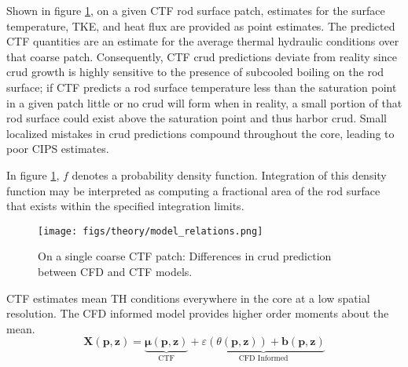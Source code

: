 Shown in figure \ref{fig:model_overview}, on a given CTF rod surface patch, estimates for the surface temperature, TKE, and heat flux are provided as point estimates.  The predicted CTF quantities are an estimate for the average thermal hydraulic conditions over that coarse patch.   Consequently, CTF crud predictions deviate from reality since crud growth is highly sensitive to the presence of subcooled boiling on the rod surface; if CTF predicts a rod surface temperature less than the saturation point in a given patch little or no crud will form when in reality, a small portion of that rod surface could exist above the saturation point and thus harbor crud.  Small localized mistakes in crud predictions compound throughout the core, leading to poor CIPS estimates.

In figure \ref{fig:model_overview}, $f$ denotes a probability density function.  Integration of this density function may be interpreted as computing a fractional area of the rod surface that exists within the specified integration limits.
\begin{figure}[!htbp]
    \centering
    \texttt{[image: figs/theory/model\_relations.png]}
    \caption{On a single coarse CTF patch: Differences in crud prediction between CFD and CTF models.}
    \label{fig:model_overview}
\end{figure}

CTF estimates mean TH conditions everywhere in the core at a low spatial resolution.  The CFD informed model provides higher order moments about the mean.
\begin{equation}
   \mathbf X(\mathbf p, \mathbf z) = \underbrace{ \bm \mu(\mathbf p, \mathbf{z})}_\text{CTF} +
   \underbrace{\varepsilon({\theta (\bm p, \mathbf z)}) + \bm b(\mathbf p, \mathbf{z})}_\text{CFD Informed}
   \label{eq:hi2lo_overview}
\end{equation}

